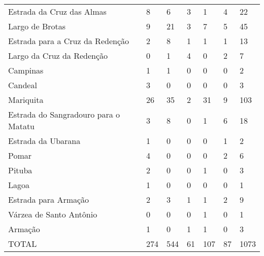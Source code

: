 \begin{table}[!htp]
{\begin{tiny}
\begin{tabular}{m{4cm}llllll}
Estrada da Cruz das Almas	&8	&6	&3	&1	&4	&22	\\
Largo de Brotas	&9	&21	&3	&7	&5	&45	\\
Estrada para a Cruz da Redenção	&2	&8	&1	&1	&1	&13	\\
Largo da Cruz da Redenção	&0	&1	&4	&0	&2	&7	\\
Campinas	&1	&1	&0	&0	&0	&2	\\
Candeal	&3	&0	&0	&0	&0	&3	\\
Mariquita	&26	&35	&2	&31	&9	&103	\\
Estrada do Sangradouro para o Matatu	&3	&8	&0	&1	&6	&18	\\
Estrada da Ubarana	&1	&0	&0	&0	&1	&2	\\
Pomar	&4	&0	&0	&0	&2	&6	\\
Pituba	&2	&0	&0	&1	&0	&3	\\
Lagoa	&1	&0	&0	&0	&0	&1	\\
Estrada para Armação	&2	&3	&1	&1	&2	&9	\\
Várzea de Santo Antônio	&0	&0	&0	&1	&0	&1	\\
Armação	&1	&0	&1	&1	&0	&3	\\
\midrule
TOTAL	&274	&544	&61	&107	&87	&1073	\\
\bottomrule
\end{tabular}
\end{tiny}}
{}
\end{table}